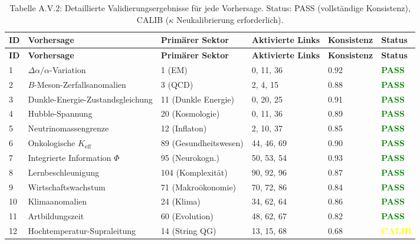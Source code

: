 \documentclass[13pt,a4paper]{article}
\begin{document}
	\begin{longtable}{|p{0.8cm}|p{2.5cm}|p{1.8cm}|p{1.5cm}|p{1.5cm}|p{1.8cm}|}
		\caption{Tabelle A.V.2: Detaillierte Validierungsergebnisse für jede Vorhersage. Status: PASS (vollständige Konsistenz), CALIB ($\kappa$ Neukalibrierung erforderlich).}
		\label{tab:detailed-validation} \\
		\hline
		\textbf{ID} & \textbf{Vorhersage} & \textbf{Primärer Sektor} & \textbf{Aktivierte Links} & \textbf{Konsistenz} & \textbf{Status} \\
		\hline
		\endfirsthead
		\hline
		\textbf{ID} & \textbf{Vorhersage} & \textbf{Primärer Sektor} & \textbf{Aktivierte Links} & \textbf{Konsistenz} & \textbf{Status} \\
		\hline
		\endhead
		1 & $\Delta\alpha/\alpha$-Variation & 1 (EM) & 0, 11, 36 & 0.92 & \textcolor{green}{\textbf{PASS}} \\
		\hline
		2 & $B$-Meson-Zerfallsanomalien & 3 (QCD) & 2, 4, 15 & 0.88 & \textcolor{green}{\textbf{PASS}} \\
		\hline
		3 & Dunkle-Energie-Zustandsgleichung & 11 (Dunkle Energie) & 0, 20, 25 & 0.91 & \textcolor{green}{\textbf{PASS}} \\
		\hline
		4 & Hubble-Spannung & 20 (Kosmologie) & 0, 11, 36 & 0.89 & \textcolor{green}{\textbf{PASS}} \\
		\hline
		5 & Neutrinomassengrenze & 12 (Inflaton) & 2, 10, 37 & 0.85 & \textcolor{green}{\textbf{PASS}} \\
		\hline
		6 & Onkologische $K_{\mathrm{eff}}$ & 89 (Gesundheitswesen) & 44, 46, 69 & 0.90 & \textcolor{green}{\textbf{PASS}} \\
		\hline
		7 & Integrierte Information $\Phi$ & 95 (Neurokogn.) & 50, 53, 54 & 0.93 & \textcolor{green}{\textbf{PASS}} \\
		\hline
		8 & Lernbeschleunigung & 104 (Komplexität) & 90, 92, 96 & 0.87 & \textcolor{green}{\textbf{PASS}} \\
		\hline
		9 & Wirtschaftswachstum & 71 (Makroökonomie) & 70, 72, 86 & 0.84 & \textcolor{green}{\textbf{PASS}} \\
		\hline
		10 & Klimaanomalien & 24 (Klima) & 34, 62, 64 & 0.86 & \textcolor{green}{\textbf{PASS}} \\
		\hline
		11 & Artbildungszeit & 60 (Evolution) & 48, 62, 67 & 0.82 & \textcolor{green}{\textbf{PASS}} \\
		\hline
		12 & Hochtemperatur-Supraleitung & 14 (String QG) & 13, 15, 68 & 0.68 & \textcolor{yellow}{\textbf{CALIB}} \\

\end{longtable}
\end{document}
